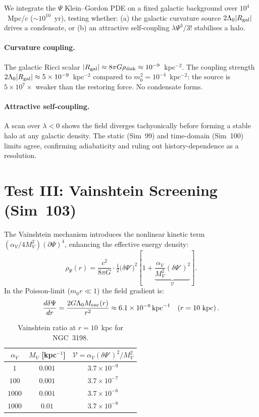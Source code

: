 \documentclass[12pt,a4paper]{article}
\begin{document}
We integrate the $\Psi$ Klein--Gordon PDE on a fixed galactic background
over $10^4$~Mpc/$c$ ($\sim 10^{10}$~yr), testing whether:
(a) the galactic curvature source $2\Lambda_0|R_{\rm gal}|$ drives a
    condensate, or
(b) an attractive self-coupling $\lambda\Psi^3/3!$ stabilises a halo.

\paragraph{Curvature coupling.}
The galactic Ricci scalar $|R_{\rm gal}|\approx 8\pi G\rho_{\rm disk}
\approx 10^{-9}$~kpc$^{-2}$.  The coupling strength
$2\Lambda_0|R_{\rm gal}|\approx5\times10^{-9}$~kpc$^{-2}$ compared
to $m_0^2=10^{-4}$~kpc$^{-2}$: the source is $5\times10^7\times$
weaker than the restoring force.  No condensate forms.

\paragraph{Attractive self-coupling.}
A scan over $\lambda<0$ shows the field diverges tachyonically before
forming a stable halo at any galactic density.  The static (Sim~99) and
time-domain (Sim~100) limits agree, confirming adiabaticity and ruling out
history-dependence as a resolution.

\section{Test III: Vainshtein Screening (Sim~103)}

The Vainshtein mechanism introduces the nonlinear kinetic term
$(\alpha_V/4M_V^2)(\partial\Psi)^4$, enhancing the effective energy
density:
\begin{equation}
\rho_\Psi(r) = \frac{c^2}{8\pi G}\cdot\tfrac{1}{2}
  \bigl(\delta\Psi'\bigr)^2
  \left[1 + \underbrace{\frac{\alpha_V}{M_V^2}(\delta\Psi')^2}_{\mathcal{V}}\right].
\end{equation}
In the Poisson-limit ($m_0 r\ll 1$) the field gradient is:
\begin{equation}
\frac{d\delta\Psi}{dr} = \frac{2G\Lambda_0 M_{\rm enc}(r)}{r^2}
  \approx 6.1\times10^{-8}\,{\rm kpc}^{-1}\quad(r=10~{\rm kpc})\,.
\end{equation}

\begin{table}[h]
\centering
\caption{Vainshtein ratio at $r=10$~kpc for NGC~3198.}
\begin{tabular}{ccc}
\toprule
$\alpha_V$ & $M_V$ [kpc$^{-1}$] & $\mathcal{V}=\alpha_V(\delta\Psi')^2/M_V^2$ \\
\midrule
$1$    & $0.001$ & $3.7\times10^{-9}$ \\
$100$  & $0.001$ & $3.7\times10^{-7}$ \\
$1000$ & $0.001$ & $3.7\times10^{-6}$ \\
$1000$ & $0.01$  & $3.7\times10^{-8}$ \\
\bottomrule
\end{tabular}
\end{table}
\end{document}
